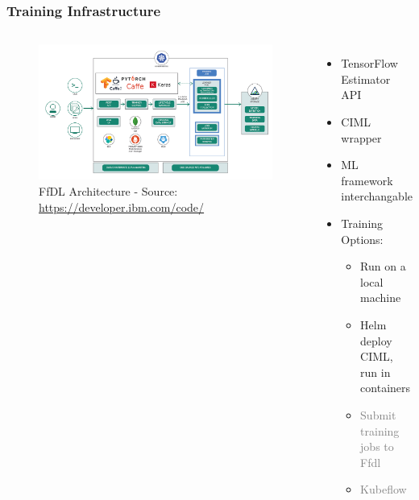 \documentclass[aspectratio=169,11pt,hyperref={colorlinks=true}]{beamer}
\newcommand{\light}[1]{\textcolor{gray}{#1}}
\begin{document}
\begin{frame}
    \frametitle{Training Infrastructure}
    \begin{columns}
        \begin{figure}
        \begin{center}
          \includegraphics[width=1\textwidth]{diagrams/FfDL-Diagram.png}
             \caption{FfDL Architecture - Source: \href{https://developer.ibm.com/code/2018/03/20/democratize-ai-with-fabric-for-deep-learning/l}{https://developer.ibm.com/code/}}
        \end{center}
        \end{figure}
        \begin{itemize}
          \item{TensorFlow Estimator API}
          \item{CIML wrapper}
          \item{ML framework interchangable}
          \item{Training Options:}
          \begin{itemize}
            \item{Run on a local machine}
            \item{Helm deploy CIML, run in containers}
            \item{\light{Submit training jobs to Ffdl}}
            \item{\light{Kubeflow}}
          \end{itemize}
        \end{itemize}
    \end{columns}
\end{frame}
\end{document}
